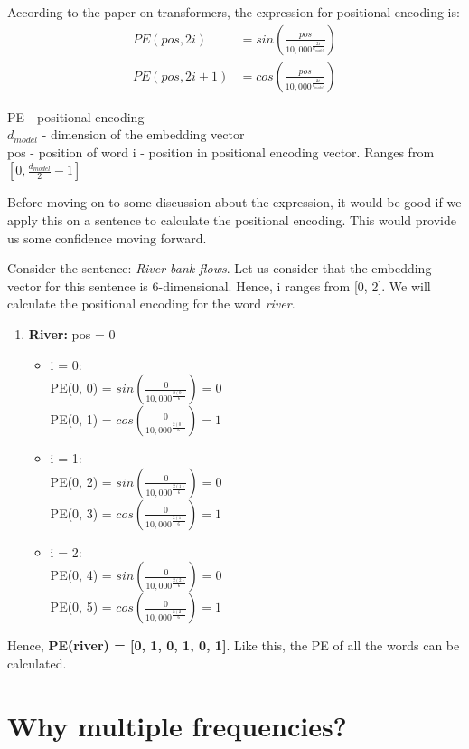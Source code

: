 According to the paper on transformers, the expression for positional encoding is:
\begin{align}
    PE(pos, 2i) &= sin\left (\frac{pos}{10,000^\frac{2i}{d_{model}}}\right)\\
    PE(pos, 2i+1) &= cos\left (\frac{pos}{10,000^\frac{2i}{d_{model}}}\right)
\end{align}

PE - positional encoding\\
$d_{model}$ - dimension of the embedding vector\\
pos - position of word
i - position in positional encoding vector. Ranges from $[0, \frac{d_{model}}{2} - 1]$

Before moving on to some discussion about the expression, it would be good if we apply this on a sentence to calculate the positional encoding. This would provide us some confidence moving forward.

Consider the sentence: \textit{River bank flows}. Let us consider that the embedding vector for this sentence is 6-dimensional. Hence, i ranges from [0, 2]. We will calculate the positional encoding for the word \textit{river}.
\begin{enumerate}
    \item \textbf{River:} pos = 0
    \begin{itemize}
        \item i = 0:\\
        PE(0, 0) = $sin\left(\frac{0}{10,000^\frac{2(0)}{6}}\right) = 0$\\
        PE(0, 1) = $cos\left(\frac{0}{10,000^\frac{2(0)}{6}}\right) = 1$
        \item i = 1:\\
        PE(0, 2) = $sin\left(\frac{0}{10,000^\frac{2(1)}{6}}\right) = 0$\\
        PE(0, 3) = $cos\left(\frac{0}{10,000^\frac{2(1)}{6}}\right) = 1$
        \item i = 2:\\
        PE(0, 4) = $sin\left(\frac{0}{10,000^\frac{2(2)}{6}}\right) = 0$\\
        PE(0, 5) = $cos\left(\frac{0}{10,000^\frac{2(2)}{6}}\right) = 1$
    \end{itemize}
\end{enumerate}

Hence, \textbf{PE(river) = [0, 1, 0, 1, 0, 1]}. Like this, the PE of all the words can be calculated.

\section{Why multiple frequencies?}

